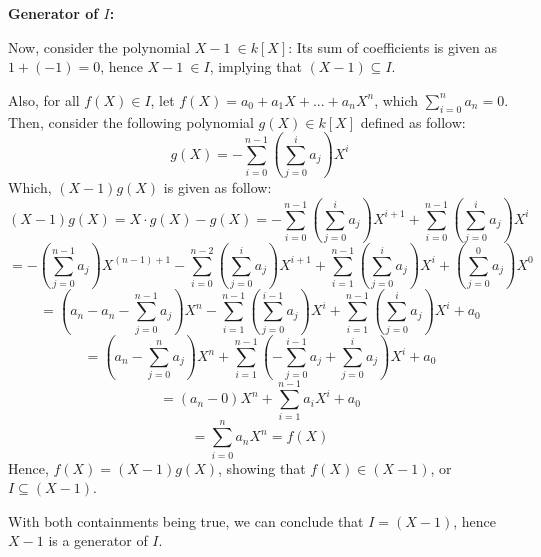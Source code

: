 \documentclass{article}
\begin{document}
\hfill

\textbf{Generator of $I$:}

Now, consider the polynomial $X-1\ \in k[X]$: Its sum of coefficients is given as $1+(-1)=0$, hence $X-1\ \in I$, implying that $(X-1)\subseteq I$.

Also, for all $f(X)\in I$, let $f(X)=a_0+a_1X+...+a_nX^n$, which $\sum_{i=0}^{n}a_n=0$. Then, consider the following polynomial $g(X)\in k[X]$ defined as follow:
$$g(X)=-\sum_{i=0}^{n-1}\left(\sum_{j=0}^{i}a_j\right)X^i$$
Which, $(X-1)g(X)$ is given as follow:
$$(X-1)g(X)= X\cdot g(X)-g(X) = -\sum_{i=0}^{n-1}\left(\sum_{j=0}^{i}a_j\right)X^{i+1}+\sum_{i=0}^{n-1}\left(\sum_{j=0}^{i}a_j\right)X^i$$
$$ = -\left(\sum_{j=0}^{n-1}a_j\right)X^{(n-1)+1} - \sum_{i=0}^{n-2}\left(\sum_{j=0}^{i}a_j\right)X^{i+1} + \sum_{i=1}^{n-1}\left(\sum_{j=0}^{i}a_j\right)X^i + \left(\sum_{j=0}^{0}a_j\right)X^0$$
$$ = \left(a_n-a_n-\sum_{j=0}^{n-1}a_j\right)X^n - \sum_{i=1}^{n-1}\left(\sum_{j=0}^{i-1}a_j\right)X^i + \sum_{i=1}^{n-1}\left(\sum_{j=0}^{i}a_j\right)X^i + a_0$$
$$ = \left(a_n-\sum_{j=0}^{n}a_j\right)X^n + \sum_{i=1}^{n-1}\left(-\sum_{j=0}^{i-1}a_j+\sum_{j=0}^{i}a_j\right)X^i + a_0$$
$$ = (a_n-0)X^n + \sum_{i=1}^{n-1}a_iX^i + a_0$$
$$= \sum_{i=0}^{n}a_nX^n = f(X)$$
Hence, $f(X)=(X-1)g(X)$, showing that $f(X)\in (X-1)$, or $I\subseteq (X-1)$.

\hfill

With both containments being true, we can conclude that $I=(X-1)$, hence $X-1$ is a generator of $I$.
\end{document}
